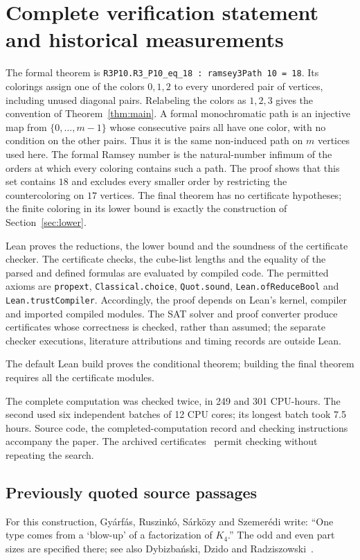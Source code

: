 \section{Complete verification statement and historical measurements}
The formal theorem is
\texttt{R3P10.R3\_P10\_eq\_18 : ramsey3Path 10 = 18}.
Its colorings assign one of the colors $0,1,2$ to every unordered pair of
vertices, including unused diagonal pairs. Relabeling the colors as
$1,2,3$ gives the convention of Theorem~\ref{thm:main}.
A formal monochromatic path is an injective map from $\{0,\dots,m-1\}$
whose consecutive pairs all have one color, with no condition on the
other pairs. Thus it is the same non-induced path on $m$ vertices used
here. The formal Ramsey number is the natural-number infimum of the
orders at which every coloring contains such a path. The proof shows
that this set contains $18$ and excludes every smaller order by
restricting the countercoloring on $17$ vertices. The final theorem has
no certificate hypotheses; the finite coloring in its lower bound is
exactly the construction of Section~\ref{sec:lower}.

Lean proves the reductions, the lower bound and the soundness of the
certificate checker. The certificate checks, the
cube-list lengths and the equality of the parsed and defined formulas
are evaluated by compiled code. The permitted axioms are
\texttt{propext}, \texttt{Classical.choice}, \texttt{Quot.sound},
\texttt{Lean.ofReduceBool} and \texttt{Lean.trustCompiler}.
Accordingly, the proof depends on Lean's kernel, compiler and imported
compiled modules. The SAT solver and proof converter produce certificates
whose correctness is checked, rather than assumed; the separate checker
executions, literature attributions and timing records are outside Lean.

The default Lean build proves the conditional theorem; building the
final theorem requires all the certificate modules.

The complete computation was checked twice, in 249 and 301 CPU-hours.
The second used six independent batches of 12 CPU cores; its longest
batch took 7.5 hours. Source code, the completed-computation record and
checking instructions accompany the paper. The archived
certificates~\cite{Gra26} permit checking without repeating the search.


\subsection{Previously quoted source passages}
For this construction, Gyárfás, Ruszinkó, Sárközy and Szemerédi
\cite[author manuscript, July 9, 2012, Section~1.1, paragraph following
Theorem~1]{GRSS07} write: ``One type comes from a `blow-up' of a
factorization of $K_4$.'' The odd and even part sizes are specified there;
see also Dybizbański, Dzido and Radziszowski~\cite[arXiv:1207.5851v3,
Section~2, paragraph following Conjecture~2]{DDR16}.

